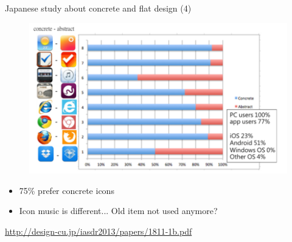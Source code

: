 \documentclass{beamer}
\begin{document}
\begin{frame}{Japanese study about concrete and flat design (4)}
	\begin{figure}
    	\centering
        \includegraphics[scale=0.6]{finalStat.png}
    \end{figure}
    \begin{itemize}
        \item 75\% prefer concrete icons
		\item Icon music is different... Old item not used anymore?
    \end{itemize} 
	\begin{flushright}\tiny\url{http://design-cu.jp/iasdr2013/papers/1811-1b.pdf}\normalsize\end{flushright}
\end{frame}

%
%
\end{document}
